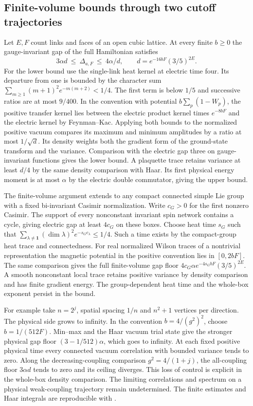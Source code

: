\documentclass[11pt]{article}
\numberwithin{equation}{section}
\theoremstyle{remark}
\begin{document}
\subsection{Finite-volume bounds through two cutoff trajectories}

Let $E,F$ count links and faces of an open cubic lattice. At every finite
$b\ge0$ the gauge-invariant gap of the full Hamiltonian satisfies
\[
 3\alpha d\ \leq\ \Delta_{a,F}\ \leq\ 4\alpha/d,
 \qquad d=e^{-16bF}(3/5)^{2E}.
\]
For the lower bound use the single-link heat kernel at electric time four.
Its departure from one is bounded by the character sum
$\sum_{m\ge1}(m+1)^2 e^{-m(m+2)}<1/4$. The first term is below $1/5$
and successive ratios are at most $9/400$. In the convention with potential
$b\sum_p(1-W_p)$, the positive transfer kernel lies between the electric
product kernel times $e^{-8bF}$ and the electric kernel by Feynman--Kac.
Applying both bounds to the normalized positive vacuum compares its maximum
and minimum amplitudes by a ratio at most $1/\sqrt d$. Its density weights
both the gradient form of the ground-state transform and the variance.
Comparison with the electric gap three on gauge-invariant functions gives
the lower bound. A plaquette trace retains variance at least $d/4$ by the
same density comparison with Haar. Its first physical energy moment is at
most $\alpha$ by the electric double commutator, giving the upper bound.

The finite-volume argument extends to any compact connected simple Lie group
with a fixed bi-invariant Casimir normalization. Write $c_G>0$ for the first
nonzero Casimir. The support of every nonconstant invariant spin network
contains a cycle, giving electric gap at least $4c_G$ on these boxes.
Choose heat time $s_G$ such that
$\sum_{\lambda\ne\mathbf1}(\dim\lambda)^2 e^{-s_G c_\lambda}\le1/4$.
Such a time exists by the compact-group heat trace and connectedness.
For real normalized Wilson traces of a nontrivial representation the
magnetic potential in the positive convention lies in $[0,2bF]$. The same
comparison gives the full finite-volume gap floor
$4c_G\alpha e^{-4s_G bF}(3/5)^{2E}$. A smooth nonconstant local trace retains
positive variance by density comparison and has finite gradient energy.
The group-dependent heat time and the whole-box exponent persist in the bound.

For example take $n=2^j$, spatial spacing $1/n$ and $n^2+1$ vertices
per direction. The physical side grows to infinity. In the convention
$b=4/(g^2)^2$, choose $b=1/(512F)$. Min--max and the Haar vacuum trial
state give the stronger physical gap floor $(3-1/512)\alpha$, which goes
to infinity. At each fixed positive physical time every connected vacuum
correlation with bounded variance tends to zero. Along the decreasing-coupling
comparison $g^2=4/(1+j)$, the all-coupling floor $3\alpha d$ tends to zero
and its ceiling diverges. This loss of control is explicit in the whole-box
density comparison. The limiting correlations and spectrum on a physical
weak-coupling trajectory remain undetermined. The finite estimates and Haar
integrals are reproducible with
.
\end{document}
